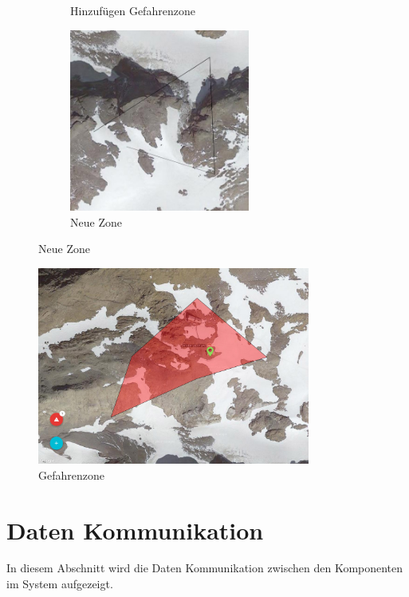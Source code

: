\documentclass[11pt,english,german]{report}
\theoremstyle{definition}
\begin{document}
\begin{figure}[H]
\begin{subfigure}{.2\textwidth}
		\caption[Knopf zum hinzufügen von Gefahrenzonen]
		{Hinzufügen Gefahrenzone}
	\end{subfigure}%
	\begin{subfigure}{.6\textwidth}
		\centering
		\includegraphics[width=0.65\textwidth]{img/atasweb/atas-web-drawing.jpg}
		\caption[Neue Zone zeichnen]
		{Neue Zone}
	\end{subfigure}%
\end{figure}
\begin{figure}[H]
	\centering
	\includegraphics[width=0.8\textwidth]{img/atasweb/atas-web-dangerzone.jpg}
	\caption[Gefahrenzone]
	{Gefahrenzone}
\end{figure}%

\section{Daten Kommunikation}
In diesem Abschnitt wird die Daten Kommunikation zwischen den Komponenten im System aufgezeigt.
\end{document}
